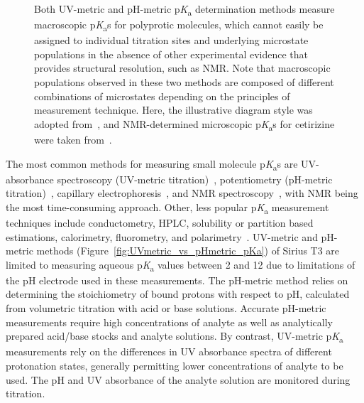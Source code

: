 \documentclass[9pt,lineno]{elife}
\newcommand{\pKa}{p\textit{K}\textsubscript{a}}
\begin{document}
\begin{figure}
\begin{center}
{Both UV-metric and pH-metric \pKa{} determination methods measure macroscopic \pKa{}s for polyprotic molecules, which cannot easily be assigned to individual titration sites and underlying microstate populations in the absence of other experimental evidence that provides structural resolution, such as NMR. 
Note that macroscopic populations observed in these two methods are composed of different combinations of microstates depending on the principles of measurement technique.
Here, the illustrative diagram style was adopted from~\citep{rupp_predicting_2011}, and NMR-determined microscopic \pKa{}s for cetirizine were taken from~\citep{marosi_triprotic_2009}. 
}
\label{fig:micro_vs_macro_pKa}
\end{center}
\end{figure}

The most common methods for measuring small molecule \pKa{}s are UV-absorbance spectroscopy (UV-metric titration)~\citep{tam_multi-wavelength_2001, allen_multiwavelength_1998,comer_ionization_2014}, potentiometry (pH-metric titration)~\citep{avdeef_ph-metric_1999,comer_ionization_2014}, capillary electrophoresis~\citep{cabot_novel_2015, wan_rapid_2002}, and NMR spectroscopy~\citep{bezencon_pka_2014}, with NMR being the most time-consuming approach. 
Other, less popular \pKa{} measurement techniques include conductometry, HPLC, solubility or partition based estimations, calorimetry, fluorometry, and polarimetry~\citep{reijenga_development_2013}. 
UV-metric and pH-metric methods (Figure~\ref{fig:UVmetric_vs_pHmetric_pKa}) of Sirius T3 are limited to measuring aqueous \pKa{} values between 2 and 12 due to limitations of the pH electrode used in these measurements.
The pH-metric method relies on determining the stoichiometry of bound protons with respect to pH, calculated from volumetric titration with acid or base solutions. Accurate pH-metric measurements require high concentrations of analyte as well as analytically prepared acid/base stocks and analyte solutions. 
By contrast, UV-metric \pKa{} measurements rely on the differences in UV absorbance spectra of different protonation states, generally permitting lower concentrations of analyte to be used.
The pH and UV absorbance of the analyte solution are monitored during titration. 
\end{document}

